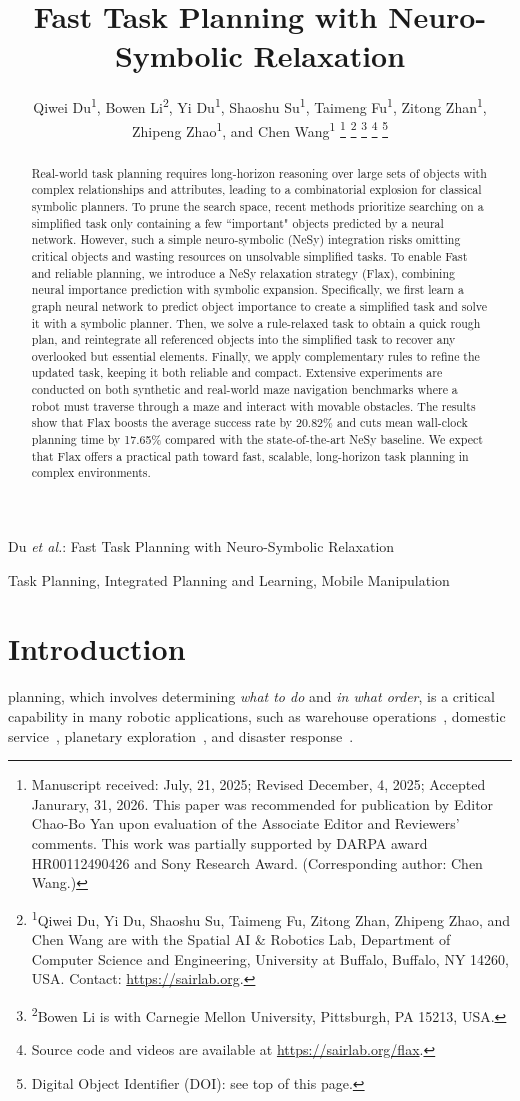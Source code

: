 \documentclass[letterpaper, 10pt, journal, twoside]{IEEEtran}
\title{\LARGE \bf
Fast Task Planning with Neuro-Symbolic Relaxation
}
\author{Qiwei Du\textsuperscript{1}, Bowen Li\textsuperscript{2}, Yi Du\textsuperscript{1}, Shaoshu Su\textsuperscript{1}, Taimeng Fu\textsuperscript{1}, Zitong Zhan\textsuperscript{1}, Zhipeng Zhao\textsuperscript{1}, and Chen Wang\textsuperscript{1}%
\thanks{Manuscript received: July, 21, 2025; Revised December, 4, 2025; Accepted Janurary, 31, 2026. This paper was recommended for publication by Editor Chao-Bo Yan upon evaluation of the Associate Editor and Reviewers' comments. This work was partially supported by DARPA award HR00112490426 and Sony Research Award. (Corresponding author: Chen Wang.)}%
\thanks{\textsuperscript{1}Qiwei Du, Yi Du, Shaoshu Su, Taimeng Fu, Zitong Zhan, Zhipeng Zhao, and Chen Wang are with the Spatial AI \& Robotics Lab, Department of Computer Science and Engineering, University at Buffalo, Buffalo, NY 14260, USA. Contact: \url{https://sairlab.org}.}%
\thanks{\textsuperscript{2}Bowen Li is with Carnegie Mellon University, Pittsburgh, PA 15213, USA.}%
\thanks{Source code and videos are available at \url{https://sairlab.org/flax}.}
\thanks{Digital Object Identifier (DOI): see top of this page.}
}
\newcommand{\shortname}{Flax\xspace}
\begin{document}
\maketitle

{Du \MakeLowercase{\textit{et al.}}: Fast Task Planning with Neuro-Symbolic Relaxation} 


\begin{abstract}
Real-world task planning requires long-horizon reasoning over large sets of objects with complex relationships and attributes, leading to a combinatorial explosion for classical symbolic planners.
To prune the search space, recent methods prioritize searching on a simplified task only containing a few ``important" objects predicted by a neural network.
However, such a simple neuro-symbolic (NeSy) integration risks omitting critical objects and wasting resources on unsolvable simplified tasks.
To enable Fast and reliable planning, we introduce a NeSy relaxation strategy (\shortname), combining neural importance prediction with symbolic expansion.
Specifically, we first learn a graph neural network to predict object importance to create a simplified task and solve it with a symbolic planner.
Then, we solve a rule-relaxed task to obtain a quick rough plan, and reintegrate all referenced objects into the simplified task to recover any overlooked but essential elements.
Finally, we apply complementary rules to refine the updated task, keeping it both reliable and compact.
Extensive experiments are conducted on both synthetic and real-world maze navigation benchmarks where a robot must traverse through a maze and interact with movable obstacles.
The results show that \shortname boosts the average success rate by 20.82\% and cuts mean wall-clock planning time by 17.65\% compared with the state-of-the-art NeSy baseline.
We expect that \shortname offers a practical path toward fast, scalable, long-horizon task planning in complex environments.

\end{abstract}

\begin{IEEEkeywords}
Task Planning, Integrated Planning and Learning, Mobile Manipulation
\end{IEEEkeywords}


\section{Introduction}
 planning, which involves determining \emph{what to do} and \emph{in what order}, is a critical capability in many robotic applications, such as warehouse operations~\cite{leet2023task}, domestic service~\cite{wang2020home}, planetary exploration~\cite{schuster2019towards}, and disaster response~\cite{osooli2024multi}.
\end{document}
